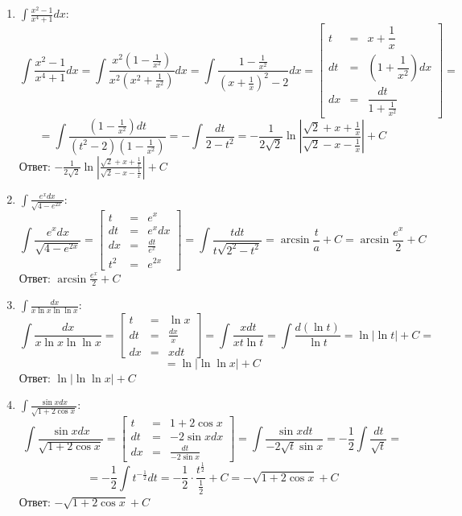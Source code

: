 \documentclass[a4paper,12pt]{article}
\begin{document}
\begin{enumerate}
    \item $\int\frac{x^2 - 1}{x^4 + 1}dx$:
    $$\int\frac{x^2 - 1}{x^4 + 1}dx = \int\frac{x^2(1 - \frac{1}{x^2})}{x^2(x^2 + \frac{1}{x^2})}dx = \int\frac{1 - \frac{1}{x^2}}{(x + \frac{1}{x})^2 - 2}dx = \left[\begin{array}{rcl}
        t & = & x + \dfrac{1}{x} \\
        dt & = & (1 + \dfrac{1}{x^2})dx \\
        dx & = & \dfrac{dt}{1 + \frac{1}{x^2}}
    \end{array}\right] =$$
    $$= \int\frac{(1-\frac{1}{x^2})dt}{(t^2-2)(1-\frac{1}{x^2})} = -\int\frac{dt}{2 - t^2} = -\frac{1}{2\sqrt{2}}\ln\left|\frac{\sqrt{2} + x + \frac{1}{x}}{\sqrt{2} - x - \frac{1}{x}}\right| + C$$
    Ответ: $-\frac{1}{2\sqrt{2}}\ln\left|\frac{\sqrt{2} + x + \frac{1}{x}}{\sqrt{2} - x - \frac{1}{x}}\right| + C$

    \item $\int\frac{e^xdx}{\sqrt{4-e^{2x}}}$:
    $$\int\frac{e^xdx}{\sqrt{4-e^{2x}}} = \left[\begin{array}{rcl}
        t & = & e^x \\
        dt & = & e^xdx \\
        dx & = & \frac{dt}{e^x} \\
        t^2 & = & e^{2x}
    \end{array}\right] = \int\frac{tdt}{t\sqrt{2^2 - t^2}} = \arcsin\frac{t}{a} + C = \arcsin\frac{e^x}{2} + C$$
    Ответ: $\arcsin\frac{e^x}{2} + C$

    \item $\int\frac{dx}{x\ln x\ln\ln x}$:
    $$\int\frac{dx}{x\ln x\ln\ln x} = \left[\begin{array}{rcl}
        t & = & \ln x \\
        dt & = & \frac{dx}{x} \\
        dx & = & xdt
    \end{array}\right] = \int\frac{xdt}{xt\ln t} = \int\frac{d(\ln t)}{\ln t} = \ln|\ln t| + C =$$
    $$= \ln|\ln\ln x| + C$$
    Ответ: $\ln|\ln\ln x| + C$

    \item $\int\frac{\sin xdx}{\sqrt{1 + 2\cos x}}$:
    $$\int\frac{\sin xdx}{\sqrt{1 + 2\cos x}} = \left[\begin{array}{rcl}
        t & = & 1 + 2\cos x \\
        dt & = & -2\sin xdx \\
        dx & = & \frac{dt}{-2\sin x}
    \end{array}\right] = \int\frac{\sin xdt}{-2\sqrt{t}\sin x} = -\frac{1}{2}\int\frac{dt}{\sqrt{t}} =$$
    $$= -\frac{1}{2}\int t^{-\frac{1}{2}}dt = -\frac{1}{2}\cdot\frac{t^{\frac{1}{2}}}{\frac{1}{2}} + C = -\sqrt{1 + 2\cos x} + C$$
    Ответ: $-\sqrt{1 + 2\cos x} + C$


\end{enumerate}
\end{document}
